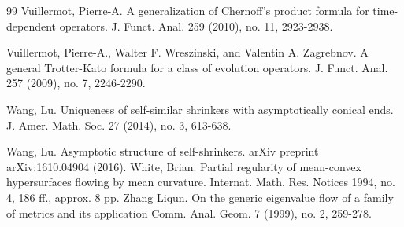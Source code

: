 \documentclass[12pt]{amsart}
\numberwithin{equation}{section}
\numberwithin{equation}{section}
\begin{document}
\begin{thebibliography}{99}
		 Vuillermot, Pierre-A. {A generalization of Chernoff's product formula for time-dependent operators.} 
		J. Funct. Anal. 259 (2010), no. 11, 2923-2938.
		
		 Vuillermot, Pierre-A., Walter F. Wreszinski, and Valentin A. Zagrebnov. {A general Trotter-Kato formula for a class of evolution operators.} 
		J. Funct. Anal. 257 (2009), no. 7, 2246-2290.
		
		 Wang, Lu. {Uniqueness of self-similar shrinkers with asymptotically conical ends.}
		J. Amer. Math. Soc. 27 (2014), no. 3, 613-638.
		
		 Wang, Lu. {Asymptotic structure of self-shrinkers.} arXiv preprint arXiv:1610.04904 (2016).
		 White, Brian. {Partial regularity of mean-convex hypersurfaces flowing by mean curvature.} Internat. Math. Res. Notices 1994, no. 4, 186 ff., approx. 8 pp.
		 Zhang Liqun. {On the generic eigenvalue flow of a family of metrics and its application} Comm. Anal. Geom. 7 (1999), no. 2, 259-278.
		
	\end{thebibliography}
\end{document}
